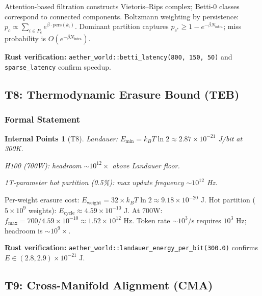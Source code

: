 \documentclass[11pt, a4paper]{article}
\theoremstyle{proofform}
\newtheorem{innerpoints}{Internal Points}
\numberwithin{innerpoints}{subsection}
\numberwithin{disproof}{subsection}
\theoremstyle{mathproof}
\begin{document}
\begin{Proof}
Attention-based filtration constructs Vietoris--Rips complex; Betti-0 classes correspond to connected components. Boltzmann weighting by persistence: $p_c \propto \sum_{i \in P_c} e^{\beta \cdot \text{pers}(k_i)}$. Dominant partition captures $p_{c^*} \geq 1 - e^{-\beta N_{\text{intra}}}$; miss probability is $O(e^{-\beta N_{\text{intra}}})$.

\textbf{Rust verification:} \texttt{aether\_world::betti\_latency(800, 150, 50)} and \texttt{sparse\_latency} confirm speedup.
\end{Proof}

\subsection{T8: Thermodynamic Erasure Bound (TEB)}
\label{sec:teb}

\subsubsection*{Formal Statement}
\begin{innerpoints}[T8]
\item Landauer: $E_{\min} = k_B T \ln 2 \approx 2.87 \times 10^{-21}$ J/bit at 300K.
\item H100 (700W): headroom $\sim 10^{12}\times$ above Landauer floor.
\item 1T-parameter hot partition (0.5\%): max update frequency $\sim 10^{12}$ Hz.
\end{innerpoints}

\begin{Proof}
Per-weight erasure cost: $E_{\text{weight}} = 32 \times k_B T \ln 2 \approx 9.18 \times 10^{-20}$ J. Hot partition ($5 \times 10^9$ weights): $E_{\text{cycle}} \approx 4.59 \times 10^{-10}$ J. At 700W: $f_{\max} = 700 / 4.59 \times 10^{-10} \approx 1.52 \times 10^{12}$ Hz. Token rate $\sim 10^3$/s requires $10^3$ Hz; headroom is $\sim 10^9\times$.

\textbf{Rust verification:} \texttt{aether\_world::landauer\_energy\_per\_bit(300.0)} confirms $E \in (2.8, 2.9) \times 10^{-21}$ J.
\end{Proof}

\subsection{T9: Cross-Manifold Alignment (CMA)}
\label{sec:cma}
\end{document}
